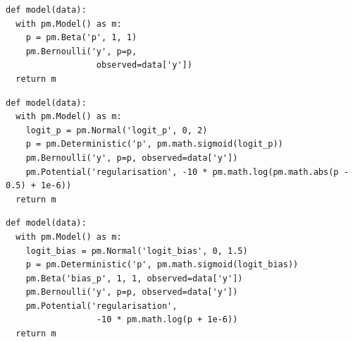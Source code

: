 \documentclass[preprint]{uai2026} %
\begin{document}

\newsavebox{\lstboxa}
\newsavebox{\lstboxb}
\newsavebox{\lstboxc}
\newsavebox{\lstboxd}

\begin{lrbox}{\lstboxa}
\begin{minipage}{0.43\textwidth}
\begin{lstlisting}[style=pymc]
def model(data):
  with pm.Model() as m:
    p = pm.Beta('p', 1, 1)
    pm.Bernoulli('y', p=p,
                  observed=data['y'])
  return m
\end{lstlisting}
\end{minipage}
\end{lrbox}

\begin{lrbox}{\lstboxb}
\begin{minipage}{0.43\textwidth}
\begin{lstlisting}[style=pymc]
def model(data):
  with pm.Model() as m:
    logit_p = pm.Normal('logit_p', 0, 2)
    p = pm.Deterministic('p', pm.math.sigmoid(logit_p))
    pm.Bernoulli('y', p=p, observed=data['y'])
    pm.Potential('regularisation', -10 * pm.math.log(pm.math.abs(p - 0.5) + 1e-6))
  return m
\end{lstlisting}
\end{minipage}
\end{lrbox}

\begin{lrbox}{\lstboxc}
\begin{minipage}{0.43\textwidth}
\begin{lstlisting}[style=pymc]
def model(data):
  with pm.Model() as m:
    logit_bias = pm.Normal('logit_bias', 0, 1.5)
    p = pm.Deterministic('p', pm.math.sigmoid(logit_bias))
    pm.Beta('bias_p', 1, 1, observed=data['y'])
    pm.Bernoulli('y', p=p, observed=data['y'])
    pm.Potential('regularisation', 
                  -10 * pm.math.log(p + 1e-6))
  return m
\end{lstlisting}
\end{minipage}
\end{lrbox}
\end{document}
